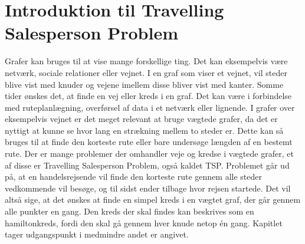 \section{Introduktion til Travelling Salesperson Problem}
Grafer kan bruges til at vise mange forskellige ting. 
Det kan eksempelvis være netværk, sociale relationer eller vejnet. 
I en graf som viser et vejnet, vil steder blive vist med knuder og vejene imellem disse bliver vist med kanter.
Somme tider ønskes det, at finde en vej eller kreds i en graf.
Det kan være i forbindelse med ruteplanlægning, overførsel af data i et netværk eller lignende. 
I grafer over eksempelvis vejnet er det meget relevant at bruge vægtede grafer, da det er nyttigt at kunne se hvor lang en strækning mellem to steder er.
Dette kan så bruges til at finde den korteste rute eller bare undersøge længden af en bestemt rute. 
Der er mange problemer der omhandler veje og kredse i vægtede grafer, et af disse er Travelling Salesperson Problem, også kaldet TSP.
Problemet går ud på, at en handelsrejsende vil finde den korteste rute gennem alle steder vedkommende vil besøge, og til sidst ender tilbage hvor rejsen startede.
Det vil altså sige, at det ønskes at finde en simpel kreds i en vægtet graf, der går gennem alle punkter en gang. 
Den kreds der skal findes kan beskrives som en hamiltonkreds, fordi den skal gå gennem hver knude netop én gang. Kapitlet tager udgangspunkt i \citep{metrictsp} medmindre andet er angivet.
